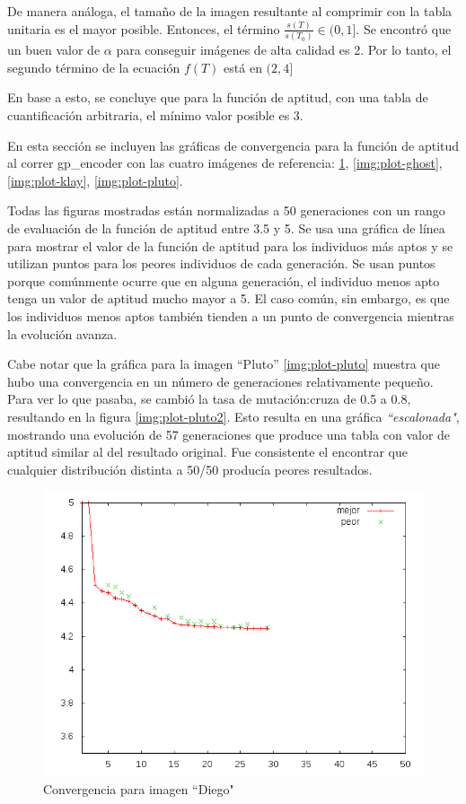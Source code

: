 De manera análoga, el tamaño de la imagen resultante al comprimir con la tabla
unitaria es el mayor posible. Entonces, el término $\frac{s(T)}{s(T_0)} \in (0,
1]$. Se encontró que un buen valor de $\alpha$ para conseguir imágenes de alta
calidad es 2. Por lo tanto, el segundo término de la ecuación $f(T)$ está en
$(2, 4]$

En base a esto, se concluye que para la función de aptitud, con una tabla de
cuantificación arbitraria, el mínimo valor posible es 3.

En esta sección se incluyen las gráficas de convergencia para la función de
aptitud al correr gp\_encoder con las cuatro imágenes de referencia:
\ref{img:plot-diego}, \ref{img:plot-ghost}, \ref{img:plot-klay}, \ref{img:plot-pluto}.

Todas las figuras mostradas están normalizadas a 50 generaciones con un rango
de evaluación de la función de aptitud entre 3.5 y 5. Se usa una gráfica de
línea para mostrar el valor de la función de aptitud para los individuos más
aptos y se utilizan puntos para los peores individuos de cada generación. Se
usan puntos porque comúnmente ocurre que en alguna generación, el individuo
menos apto tenga un valor de aptitud mucho mayor a 5. El caso común, sin
embargo, es que los individuos menos aptos también tienden a un punto de
convergencia mientras la evolución avanza.

Cabe notar que la gráfica para la imagen ``Pluto'' \ref{img:plot-pluto} muestra
que hubo una convergencia en un número de generaciones relativamente pequeño.
Para ver lo que pasaba, se cambió la tasa de mutación:cruza de 0.5 a 0.8,
resultando en la figura \ref{img:plot-pluto2}. Esto resulta en una gráfica
\emph{``escalonada"}, mostrando una evolución de 57 generaciones que produce
una tabla con valor de aptitud similar al del resultado original. Fue
consistente el encontrar que cualquier distribución distinta a 50/50 producía
peores resultados.

\begin{figure}[b]
    \includegraphics[width=1.0\textwidth]{plot_diego}
    \caption{Convergencia para imagen ``Diego"}
    \label{img:plot-diego}
\end{figure}


